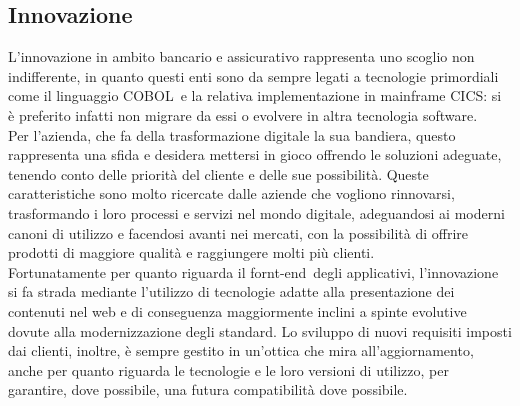 	
	\subsection{Innovazione}
	
	L'innovazione in ambito bancario e assicurativo rappresenta uno scoglio non indifferente, in quanto questi enti sono da sempre legati a tecnologie primordiali come il linguaggio COBOL\glossario\ e la relativa implementazione in mainframe CICS\glossario : si è preferito infatti non migrare da essi o evolvere in altra tecnologia software.\\
	
	Per l'azienda, che fa della trasformazione digitale la sua bandiera, questo rappresenta una sfida e desidera mettersi in gioco offrendo le soluzioni adeguate, tenendo conto delle priorità del cliente e delle sue possibilità. Queste caratteristiche sono molto ricercate dalle aziende che vogliono rinnovarsi, trasformando i loro processi e servizi nel mondo digitale, adeguandosi ai moderni canoni di utilizzo e facendosi avanti nei mercati, con la possibilità di offrire prodotti di maggiore qualità e raggiungere molti più clienti.\\
	
	Fortunatamente per quanto riguarda il fornt-end\glossario\ degli applicativi, l'innovazione si fa strada mediante l'utilizzo di tecnologie adatte alla presentazione dei contenuti	nel web e di conseguenza maggiormente inclini a spinte evolutive dovute alla modernizzazione degli standard. Lo sviluppo di nuovi requisiti imposti dai clienti, inoltre, è sempre gestito in un'ottica che mira all'aggiornamento, anche per quanto riguarda le tecnologie e le loro versioni di utilizzo, per garantire, dove possibile, una futura compatibilità dove possibile.